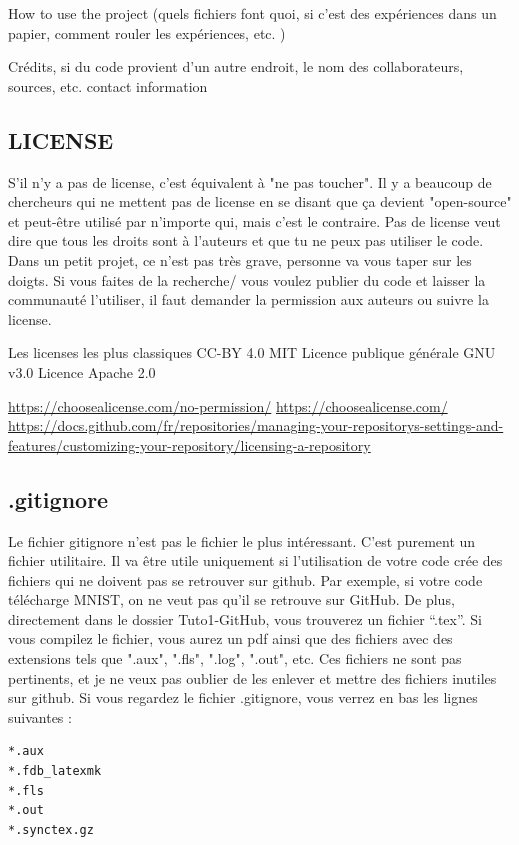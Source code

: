 \documentclass{book}
\begin{document}
How to use the project (quels fichiers font quoi, si c'est des expériences dans un papier, comment rouler les expériences, etc. )

Crédits, si du code provient d'un autre endroit, le nom des collaborateurs, sources, etc. 
contact information
\subsection{LICENSE}

S'il n'y a pas de license, c'est équivalent à "ne pas toucher". Il y a beaucoup de chercheurs qui ne mettent pas de license en se disant que ça devient "open-source" et peut-être utilisé par n'importe qui, mais c'est le contraire. Pas de license veut dire que tous les droits sont à l'auteurs et que tu ne peux pas utiliser le code. Dans un petit projet, ce n'est pas très grave, personne va vous taper sur les doigts. Si vous faites de la recherche/ vous voulez publier du code et laisser la communauté l'utiliser, il faut demander la permission aux auteurs ou suivre la license. 

Les licenses les plus classiques
CC-BY 4.0 
MIT
Licence publique générale GNU v3.0
Licence Apache 2.0

\url{https://choosealicense.com/no-permission/}
\url{https://choosealicense.com/}
\url{https://docs.github.com/fr/repositories/managing-your-repositorys-settings-and-features/customizing-your-repository/licensing-a-repository}


\subsection{.gitignore}
Le fichier gitignore n'est pas le fichier le plus intéressant. C'est purement un fichier utilitaire. Il va être utile uniquement si l'utilisation de votre code crée des fichiers qui ne doivent pas se retrouver sur github. Par exemple, si votre code télécharge MNIST, on ne veut pas qu'il se retrouve sur GitHub. De plus, directement dans le dossier Tuto1-GitHub, vous trouverez un fichier ``.tex''. Si vous compilez le fichier, vous aurez un pdf ainsi que des fichiers avec des extensions tels que ".aux", ".fls", ".log", ".out", etc. Ces fichiers ne sont pas pertinents, et je ne veux pas oublier de les enlever et mettre des fichiers inutiles sur github. Si vous regardez le fichier .gitignore, vous verrez en bas les lignes suivantes : 

\begin{lstlisting}
*.aux
*.fdb_latexmk
*.fls
*.out
*.synctex.gz
\end{lstlisting}
\end{document}
